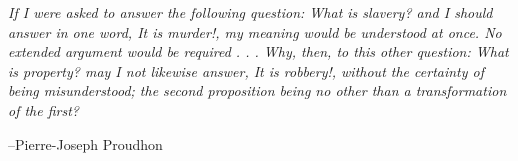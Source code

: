 \documentclass[fleqn,addpoints]{exam}
\begin{document}
\else

\vspace{4 in}

{\em If I were asked to answer the following question: What is slavery? and I should answer in one word, It is murder!,
  my meaning would be understood at once. No extended argument would be required . . . Why, then, to this other
  question: What is property? may I not likewise answer, It is robbery!, without the certainty of being misunderstood;
  the second proposition being no other than a transformation of the first?}

\vspace{.1 cm}
\hspace{1 cm} --Pierre-Joseph Proudhon
\fi
\end{document}
